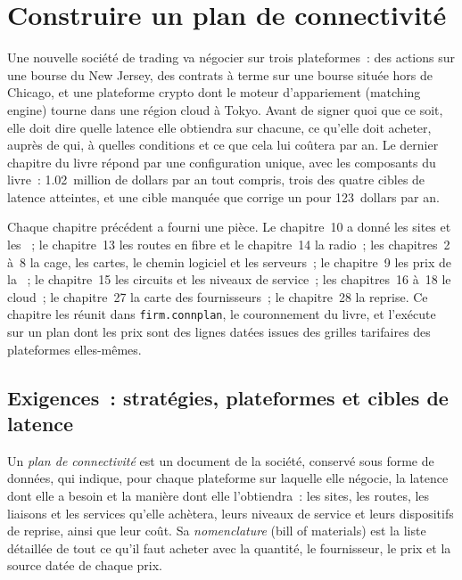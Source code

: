\chapter{Construire un plan de connectivité}\label{ch:nw:build-a-connectivity-plan}

Une nouvelle société de trading va négocier sur trois plateformes~: des actions sur une bourse du New Jersey, des contrats à terme sur une bourse située hors de Chicago, et une plateforme crypto
dont le moteur d'appariement (matching engine) tourne dans une région cloud à Tokyo. Avant de signer quoi que ce soit, elle doit dire quelle latence elle obtiendra sur
chacune, ce qu'elle doit acheter, auprès de qui, à quelles conditions et ce que cela lui coûtera par an. Le dernier chapitre du livre répond par une
configuration unique, avec les composants du livre~: 1.02~million de dollars par an tout compris, trois des quatre cibles de latence atteintes, et une cible manquée
que corrige un  pour 123~dollars par an.

Chaque chapitre précédent a fourni une pièce. Le chapitre~10 a donné les sites et les ~; le chapitre~13 les routes en fibre et le chapitre~14
la radio~; les chapitres~2 à~8 la cage, les cartes, le chemin logiciel et les serveurs~; le chapitre~9 les prix de la ~; le chapitre~15 les circuits et les niveaux de
service~; les chapitres~16 à~18 le cloud~; le chapitre~27 la carte des fournisseurs~; le chapitre~28 la reprise. Ce chapitre les réunit dans
\texttt{firm.connplan}, le couronnement du livre, et l'exécute sur un plan dont les prix sont des lignes datées issues des grilles tarifaires des plateformes elles-mêmes.

\section{Exigences~: stratégies, plateformes et cibles de latence}

\begin{definition}\label{def:nw:build-a-connectivity-plan:plan}
Un \emph{plan de connectivité} est un document de la société, conservé sous forme de données, qui indique, pour chaque plateforme sur laquelle elle négocie,
la latence dont elle a besoin et la manière dont elle l'obtiendra~: les sites, les routes, les liaisons et les services qu'elle achètera, leurs niveaux de service et
leurs dispositifs de reprise, ainsi que leur coût. Sa \emph{nomenclature} (bill of materials) est la liste détaillée de tout ce qu'il faut acheter
avec la quantité, le fournisseur, le prix et la source datée de chaque prix.
\end{definition}

